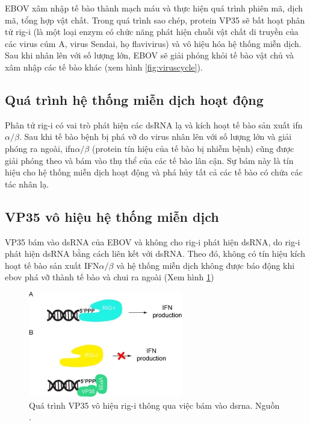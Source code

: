 \documentclass[12pt,a4paper,reqno, oneside]{book}
\begin{document}
		EBOV xâm nhập tế bào thành mạch máu và thực hiện quá trình phiên mã, dịch mã, tổng hợp vật chất. Trong quá trình sao chép, protein VP35 sẽ bất hoạt phân tử \gls{rig-i} (là một loại enzym có chức năng phát hiện chuỗi vật chất di truyền của các virus cúm A, virus Sendai, họ flavivirus) và vô hiệu hóa hệ thống miễn dịch. Sau khi nhân lên với số lượng lớn, EBOV sẽ giải phóng khỏi tế bào vật chủ và xâm nhập các tế bào khác\cite{Colebunders2000} (xem hình \ref{fig:viruscycle}).
\subsection{Quá trình hệ thống miễn dịch hoạt động}

		Phân tử \gls{rig-i} có vai trò phát hiện các dsRNA lạ và kích hoạt tế bào sản xuất \gls{ifn}$\alpha / \beta$\cite{Cardenas2006}. Sau khi tế bào bệnh bị phá vỡ do virus nhân lên với số lượng lớn và giải phóng ra ngoài, \gls{ifn}$\alpha / \beta$ (protein tín hiệu của tế bào bị nhiễm bệnh) cũng được giải phóng theo và bám vào thụ thể của các tế bào lân cận. Sự bám này là tín hiệu cho hệ thống miễn dịch hoạt động và phá hủy tất cả các tế bào có chứa các tác nhân lạ\cite{DeAndrea2002}.
%		
\subsection{VP35 vô hiệu hệ thống miễn dịch}
		VP35 bám vào dsRNA của EBOV và không cho \gls{rig-i} phát hiện dsRNA, do \gls{rig-i} phát hiện dsRNA bằng cách liên kết với dsRNA. Theo đó, không có tín hiệu kích hoạt tế bào sản xuất IFN$\alpha / \beta$ và hệ thống miễn dịch không được báo động khi \gls{ebov} phá vỡ thành tế bào và chui ra ngoài\cite{Hartman2004} (Xem hình \ref{fig:rig-i})
		\begin{figure}[h]
		\centering
		\includegraphics[width=0.6\textwidth,natwidth=610,natheight=642]{RIG-I}
		\caption{Quá trình VP35 vô hiệu \gls{rig-i} thông qua việc bám vào \gls{dsrna}. Nguồn \cite{Ramanan2011}.}
		\label{fig:rig-i}
		\end{figure}
\end{document}
